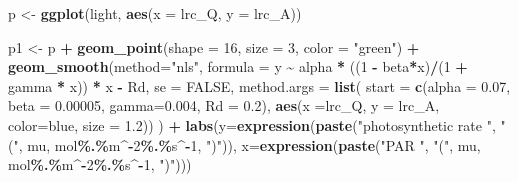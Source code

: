 \documentclass[
]{krantz}
\makeatletter
\newenvironment{Shaded}{\begin{snugshade}}{\end{snugshade}}
\newcommand{\DataTypeTok}[1]{\textcolor[rgb]{0.13,0.29,0.53}{#1}}
\newcommand{\DecValTok}[1]{\textcolor[rgb]{0.00,0.00,0.81}{#1}}
\newcommand{\FloatTok}[1]{\textcolor[rgb]{0.00,0.00,0.81}{#1}}
\newcommand{\KeywordTok}[1]{\textcolor[rgb]{0.13,0.29,0.53}{\textbf{#1}}}
\newcommand{\NormalTok}[1]{#1}
\newcommand{\OperatorTok}[1]{\textcolor[rgb]{0.81,0.36,0.00}{\textbf{#1}}}
\newcommand{\OtherTok}[1]{\textcolor[rgb]{0.56,0.35,0.01}{#1}}
\newcommand{\StringTok}[1]{\textcolor[rgb]{0.31,0.60,0.02}{#1}}
\newenvironment{kframe}{%
\medskip{}
\setlength{\fboxsep}{.8em}
 \def\at@end@of@kframe{}%
 \ifinner\ifhmode%
  \def\at@end@of@kframe{\end{minipage}}%
  \begin{minipage}{\columnwidth}%
 \fi\fi%
 \def\FrameCommand##1{\hskip\@totalleftmargin \hskip-\fboxsep
 \colorbox{shadecolor}{##1}\hskip-\fboxsep
     \hskip-\linewidth \hskip-\@totalleftmargin \hskip\columnwidth}%
 \MakeFramed {\advance\hsize-\width
   \@totalleftmargin\z@ \linewidth\hsize
   \@setminipage}}%
 {\par\unskip\endMakeFramed%
 \at@end@of@kframe}
\renewenvironment{Shaded}{\begin{kframe}}{\end{kframe}}
\makeatother
\begin{document}
\begin{Shaded}
\begin{Highlighting}[]
\NormalTok{p \textless{}{-}}\StringTok{ }\KeywordTok{ggplot}\NormalTok{(light, }\KeywordTok{aes}\NormalTok{(}\DataTypeTok{x =}\NormalTok{ lrc\_Q, }\DataTypeTok{y =}\NormalTok{ lrc\_A))}

\NormalTok{p1 \textless{}{-}}\StringTok{ }\NormalTok{p }\OperatorTok{+}\StringTok{ }
\StringTok{  }\KeywordTok{geom\_point}\NormalTok{(}\DataTypeTok{shape =} \DecValTok{16}\NormalTok{, }\DataTypeTok{size =} \DecValTok{3}\NormalTok{, }\DataTypeTok{color =} \StringTok{"green"}\NormalTok{) }\OperatorTok{+}\StringTok{ }
\StringTok{  }\KeywordTok{geom\_smooth}\NormalTok{(}\DataTypeTok{method=}\StringTok{"nls"}\NormalTok{, }\DataTypeTok{formula =} 
\NormalTok{   y }\OperatorTok{\textasciitilde{}}\StringTok{ }\NormalTok{alpha }\OperatorTok{*}\StringTok{ }\NormalTok{((}\DecValTok{1} \OperatorTok{{-}}\StringTok{ }
\StringTok{              }\NormalTok{beta}\OperatorTok{*}\NormalTok{x)}\OperatorTok{/}\NormalTok{(}\DecValTok{1} \OperatorTok{+}\StringTok{ }\NormalTok{gamma }\OperatorTok{*}\StringTok{ }\NormalTok{x)) }\OperatorTok{*}\StringTok{ }\NormalTok{x }\OperatorTok{{-}}\StringTok{ }\NormalTok{Rd, }
    \DataTypeTok{se =} \OtherTok{FALSE}\NormalTok{, }\DataTypeTok{method.args =} \KeywordTok{list}\NormalTok{(}
    \DataTypeTok{start =} \KeywordTok{c}\NormalTok{(}\DataTypeTok{alpha =} \FloatTok{0.07}\NormalTok{, }\DataTypeTok{beta =} \FloatTok{0.00005}\NormalTok{,}
              \DataTypeTok{gamma=}\FloatTok{0.004}\NormalTok{, }\DataTypeTok{Rd =} \FloatTok{0.2}\NormalTok{), }
    \KeywordTok{aes}\NormalTok{(}\DataTypeTok{x =}\NormalTok{lrc\_Q, }\DataTypeTok{y =}\NormalTok{ lrc\_A, }
    \DataTypeTok{color=}\StringTok{\textquotesingle{}blue\textquotesingle{}}\NormalTok{, }\DataTypeTok{size =} \FloatTok{1.2}\NormalTok{))}
\NormalTok{  ) }\OperatorTok{+}
\StringTok{  }\KeywordTok{labs}\NormalTok{(}\DataTypeTok{y=}\KeywordTok{expression}\NormalTok{(}\KeywordTok{paste}\NormalTok{(}\StringTok{"photosynthetic rate  "}\NormalTok{, }
          \StringTok{"("}\NormalTok{, mu, mol}\OperatorTok{\%.\%}\NormalTok{m}\OperatorTok{\^{}{-}}\DecValTok{2}\OperatorTok{\%.\%}\NormalTok{s}\OperatorTok{\^{}{-}}\DecValTok{1}\NormalTok{, }\StringTok{")"}\NormalTok{)), }
       \DataTypeTok{x=}\KeywordTok{expression}\NormalTok{(}\KeywordTok{paste}\NormalTok{(}\StringTok{"PAR "}\NormalTok{, }
           \StringTok{"("}\NormalTok{, mu, mol}\OperatorTok{\%.\%}\NormalTok{m}\OperatorTok{\^{}{-}}\DecValTok{2}\OperatorTok{\%.\%}\NormalTok{s}\OperatorTok{\^{}{-}}\DecValTok{1}\NormalTok{, }\StringTok{")"}\NormalTok{)))}



\end{Highlighting}
\end{Shaded}
\end{document}
